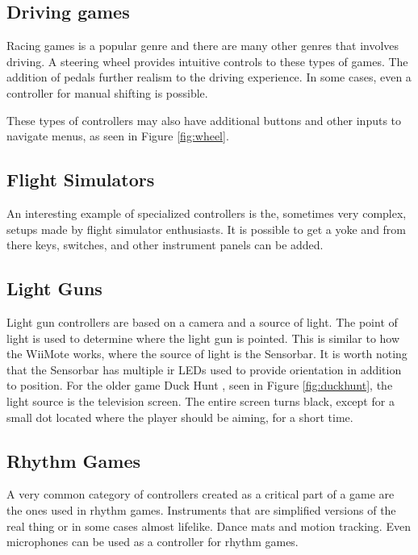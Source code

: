 \subsection{Driving games}
Racing games is a popular genre and there are many other genres that involves driving.
A steering wheel provides intuitive controls to these types of games.
The addition of pedals further realism to the driving experience.
In some cases, even a controller for manual shifting is possible.

These types of controllers may also have additional buttons and other inputs to navigate menus, as seen in Figure \ref{fig:wheel}.


\subsection{Flight Simulators}
An interesting example of specialized controllers is the, sometimes very complex, setups made by flight simulator enthusiasts.
It is possible to get a yoke and from there keys, switches, and other instrument panels can be added.

\subsection{Light Guns}
\label{lightguns}
Light gun controllers are based on a camera and a source of light.
The point of light is used to determine where the light gun is pointed.
This is similar to how the WiiMote works, where the source of light is the Sensorbar.
It is worth noting that the Sensorbar has multiple \gls{ir} LEDs used to provide orientation in addition to position.
For the older game Duck Hunt \cite{duckhunt1984}, seen in Figure \ref{fig:duckhunt}, the light source is the television screen.
The entire screen turns black, except for a small dot located where the player should be aiming, for a short time.

\subsection{Rhythm Games}
A very common category of controllers created as a critical part of a game are the ones used in rhythm games.
Instruments that are simplified versions of the real thing or in some cases almost lifelike.
Dance mats and motion tracking.
Even microphones can be used as a controller for rhythm games.


